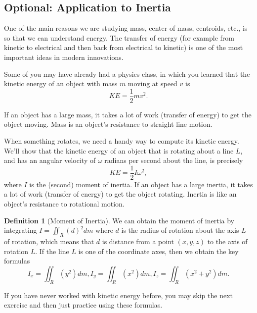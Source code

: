 \documentclass[10pt,]{book}
\theoremstyle{plain}
\theoremstyle{definition}
\newtheorem{definition}[theorem]{Definition}
\theoremstyle{definition}
\theoremstyle{definition}
\theoremstyle{definition}
\theoremstyle{definition}
\numberwithin{equation}{section}
\begin{document}
\subsection[{Optional: Application to Inertia}]{Optional: Application to Inertia}\label{subsection-35}
One of the main reasons we are studying mass, center of mass, centroids, etc., is so that we can understand energy. The transfer of energy (for example from kinetic to electrical and then back from electrical to kinetic) is one of the most important ideas in modern innovations.%
\par
Some of you may have already had a physics class, in which you learned that the kinetic energy of an object with mass \(m\) moving at speed \(v\) is%
\begin{equation*}
KE = \frac{1}{2}mv^2.
\end{equation*}
%
\par
If an object has a large mass, it takes a lot of work (transfer of energy) to get the object moving. Mass is an object's resistance to straight line motion.%
\par
When something rotates, we need a handy way to compute its kinetic energy. We'll show that the kinetic energy of an object that is rotating about a line \(L\), and has an angular velocity of \(\omega\) radians per second about the line, is precisely %
\begin{equation*}
KE = \frac{1}{2}I \omega^2,
\end{equation*}
where \(I\) is the (second) moment of inertia. If an object has a large inertia, it takes a lot of work (transfer of energy) to get the object rotating. Inertia is like an object's resistance to rotational motion.%
\begin{definition}[{Moment of Inertia}]\label{definition-42}
We can obtain the moment of inertia by integrating \(I=\iint_R (d)^2 dm\) where \(d\) is the radius of rotation about the axis \(L\) of rotation, which means that \(d\) is distance from a point \((x,y,z)\) to the axis of rotation \(L\). If the line \(L\) is one of the coordinate axes, then we obtain the key formulas%
\begin{equation*}
I_x = \iint_R (y^2)dm,
I_y = \iint_R (x^2)dm,
I_z = \iint_R (x^2+y^2)dm
.
\end{equation*}
%
\end{definition}
If you have never worked with kinetic energy before, you may skip the next exercise and then just practice using these formulas.%
\end{document}
